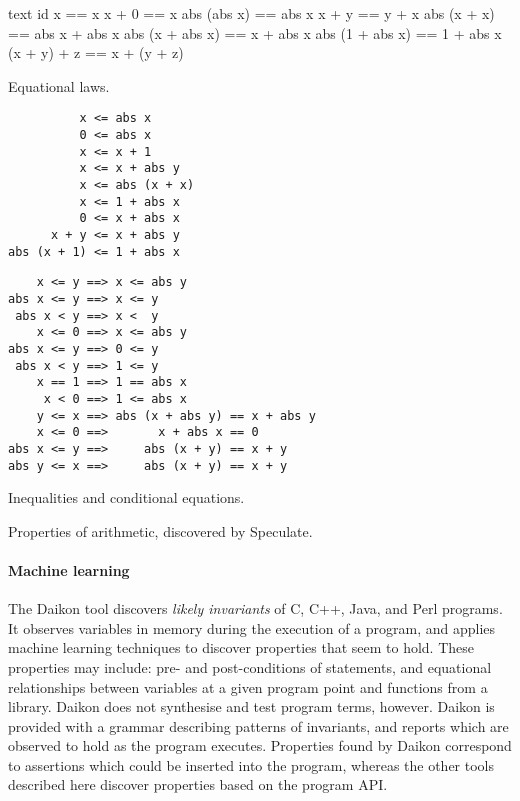 \begin{listing}
\begin{sublisting}{\textwidth}
\centering
\begin{cminted}{text}
           id x == x
          x + 0 == x
    abs (abs x) == abs x
          x + y == y + x
    abs (x + x) == abs x + abs x
abs (x + abs x) == x + abs x
abs (1 + abs x) == 1 + abs x
    (x + y) + z == x + (y + z)
\end{cminted}
\caption{Equational laws.}\label{lst:arith_props0}
\end{sublisting}

\vspace{1.5em}

\begin{sublisting}{\textwidth}
\begin{minipage}[t]{0.45\textwidth}
\begin{verbatim}
          x <= abs x
          0 <= abs x
          x <= x + 1
          x <= x + abs y
          x <= abs (x + x)
          x <= 1 + abs x
          0 <= x + abs x
      x + y <= x + abs y
abs (x + 1) <= 1 + abs x
\end{verbatim}
\end{minipage}
\begin{minipage}[t]{0.55\textwidth}
\begin{verbatim}
    x <= y ==> x <= abs y
abs x <= y ==> x <= y
 abs x < y ==> x <  y
    x <= 0 ==> x <= abs y
abs x <= y ==> 0 <= y
 abs x < y ==> 1 <= y
    x == 1 ==> 1 == abs x
     x < 0 ==> 1 <= abs x
    y <= x ==> abs (x + abs y) == x + abs y
    x <= 0 ==>       x + abs x == 0
abs x <= y ==>     abs (x + y) == x + y
abs y <= x ==>     abs (x + y) == x + y
\end{verbatim}
\end{minipage}
\caption{Inequalities and conditional equations.}\label{lst:arith_props1}
\end{sublisting}
\caption{Properties of arithmetic, discovered by Speculate.}\label{lst:arith_props}
\end{listing}

\paragraph{Machine learning}
The Daikon\cite{ernst2007} tool discovers \emph{likely invariants} of
C, C++, Java, and Perl programs.  It observes variables in memory
during the execution of a program, and applies machine learning
techniques to discover properties that seem to hold.  These properties
may include: pre- and post-conditions of statements, and equational
relationships between variables at a given program point and functions
from a library.  Daikon does not synthesise and test program terms,
however.  Daikon is provided with a grammar describing patterns of
invariants, and reports which are observed to hold as the program
executes.  Properties found by Daikon correspond to assertions which
could be inserted into the program, whereas the other tools described
here discover properties based on the program API.

